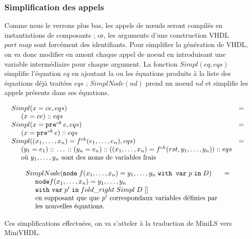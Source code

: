 \documentclass[a4paper]{article}
\newcommand{\mybox}[1]{\mbox{\tt{#1}}}
\newcommand{\ind}[0]{\hspace{0.5cm}}
\newcommand{\Cons}[0]{\; \mathbf{::} \;}
\newcommand{\Node}[4]{\mybox{node} \; f(#1) = #2 \; \mybox{with var} \
  #3 \; \mybox{in} \; #4}
\newcommand{\Pre}[1]{\mybox{pre}^{ck} \, #1}
\newcommand{\App}[2]{#1^{ck}(#2)}
\begin{document}
\subsubsection{Simplification des appels}

\newcommand{\simpl}[2]{Simpl(#1,#2)}
\newcommand{\simplnd}[1]{SimplNode(#1)}

Comme nous le verrons plus bas, les appels de nœuds seront compil\'es en
instantiations de composants ; or, les arguments d'une construction VHDL $port
\; map$ sont forc\'ement des identifiants. Pour simplifier la génération de
VHDL, on va donc modifier en amont chaque appel de noeud en introduisant une
variable interm\'ediaire pour chaque argument. La fonction $\simpl{eq}{eqs}$
simplifie l'équation $eq$ en ajoutant la ou les équations produits à la liste
des équations déjà traitées $eqs$ ; $\simplnd{nd}$ prend un noeud $nd$ et
simplifie les appels présents dans ses équations.

\[
\begin{array}{ll}
  \simpl{x = ce}{eqs} & = \\
  \ind (x = ce) \Cons eqs \\
  \simpl{x = \Pre{e}}{eqs} & = \\
  \ind (x = \Pre{e}) \Cons eqs \\

  \simpl{(x_1,\dots,x_n) = \App{f}{e_1,\dots,e_n}}{eqs} & = \\
  \ind (y_1 = e_1) \Cons \dots \Cons (y_n = e_n)
  \Cons ((x_1,\dots,x_n) = \App{f}{rst,y_1,\dots,y_n}) \Cons eqs \\
  \ind \mbox{o\`u } y_1,\dots,y_n \mbox{ sont des noms de variables frais}
\end{array}
\]

\[
\begin{array}{ll}
  \simplnd{\Node{x_1,\dots,x_n}{y_1,\dots,y_n}{p}{D}} & = \\
  \ind \mathtt{node} f(x_1,\dots,x_n) = y_1, \dots, y_n \; \\
  \ind \mathtt{with} \  \mathtt{var} \; p' \; \mathtt{in} \; fold\_right \;Simpl
  \; D \; [] \\
  \ind \mbox{en supposant que que } p' \mbox{ correspond}
  \mbox{aux variables d\'efinies par} \\ \ind \mbox{les nouvelles \'equations.}
\end{array}
\]

Ces simplifications effectu\'ees, on va s'atteler \`a la traduction de MiniLS vers
MiniVHDL.
\end{document}

